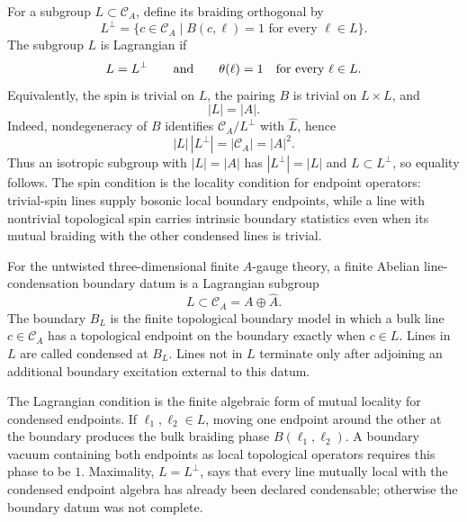 For a subgroup \(L\subset\mathcal C_A\), define its braiding orthogonal by
\begin{equation}
  L^\perp=
  \{c\in\mathcal C_A\mid B(c,\ell)=1
  \text{ for every }\ell\in L\}.
  \label{eq:finite-abelian-boundary-orthogonal}
\end{equation}
The subgroup \(L\) is Lagrangian if
\[
  L=L^\perp
  \qquad\hbox{and}\qquad
  \theta(\ell)=1\quad\hbox{for every }\ell\in L .
\]
Equivalently, the spin is trivial on \(L\), the pairing \(B\) is trivial on
\(L\times L\), and
\[
  |L|=|A|.
\]
Indeed, nondegeneracy of \(B\) identifies \(\mathcal C_A/L^\perp\) with
\(\widehat L\), hence
\[
  |L|\,|L^\perp|=|\mathcal C_A|=|A|^2 .
\]
Thus an isotropic subgroup with \(|L|=|A|\) has
\(|L^\perp|=|L|\) and \(L\subset L^\perp\), so equality follows.
The spin condition is the locality condition for endpoint operators:
trivial-spin lines supply bosonic local boundary endpoints, while a line with
nontrivial topological spin carries intrinsic boundary statistics even when
its mutual braiding with the other condensed lines is trivial.

\begin{definition}
\label{def:finite-abelian-line-condensation-boundary}
For the untwisted three-dimensional finite \(A\)-gauge theory, a finite
Abelian line-condensation boundary datum is a Lagrangian subgroup
\[
  L\subset\mathcal C_A=A\oplus\widehat A.
\]
The boundary \(B_L\) is the finite topological boundary model in which a bulk
line \(c\in\mathcal C_A\) has a topological endpoint on the boundary exactly
when \(c\in L\).  Lines in \(L\) are called condensed at \(B_L\).  Lines not
in \(L\) terminate only after adjoining an additional boundary excitation
external to this datum.
\end{definition}

The Lagrangian condition is the finite algebraic form of mutual locality for
condensed endpoints.  If \(\ell_1,\ell_2\in L\), moving one endpoint around
the other at the boundary produces the bulk braiding phase
\(B(\ell_1,\ell_2)\).  A boundary vacuum containing both endpoints as local
topological operators requires this phase to be \(1\).  Maximality,
\(L=L^\perp\), says that every line mutually local with the condensed
endpoint algebra has already been declared condensable; otherwise the
boundary datum was not complete.

